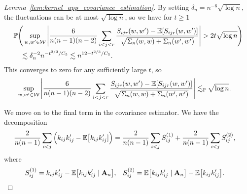 \begin{proof}[Lemma~\ref{lem:kernel_app_covariance_estimation}]
  By setting
  $\delta_n = n^{-6} \sqrt{\log n}$,
  the fluctuations can be at most $\sqrt{\log n}$,
  so we have for $t \geq 1$
  \begin{align*}
    &\mathbb{P}\Bigg(
      \sup_{w, w' \in \mathcal{W}}
      \Bigg|
      \frac{6}{n(n-1)(n-2)}
      \sum_{i<j<r}
      \frac{S_{i j r}(w,w') - \mathbb{E}[S_{i j r}(w,w')]}
      {\sqrt{\Sigma_n(w,w) + \Sigma_n(w',w')}}
      \Bigg|
      > 2t \sqrt{\log n}
    \Bigg) \\
    &\quad\lesssim
    \delta_n^{-2}
    n^{-t^{2/3} / C_5}
    \lesssim
    n^{12-t^{2/3} / C_5}.
  \end{align*}
  This converges to zero for any sufficiently large $t$, so
  \begin{align*}
    \sup_{w, w' \in \mathcal{W}}
    \Bigg|
    \frac{6}{n(n-1)(n-2)}
    \sum_{i<j<r}
    \frac{S_{i j r}(w,w') - \mathbb{E}[S_{i j r}(w,w')]}
    {\sqrt{\Sigma_n(w,w) + \Sigma_n(w',w')}}
    \Bigg|
    &\lesssim_{\mathbb{P}}
    \sqrt{\log n}.
  \end{align*}


  We move on to the final term in
  the covariance estimator.
  We have the decomposition
  \begin{align*}
    \frac{2}{n(n-1)}
    \sum_{i<j}
    \Big(
      k_{i j} k_{i j}'
      - \mathbb{E}\big[k_{i j} k_{i j}']
    \Big)
    &=
    \frac{2}{n(n-1)}
    \sum_{i<j}
    S_{i j}^{(1)}
    +
    \frac{2}{n(n-1)}
    \sum_{i<j}
    S_{i j}^{(2)},
  \end{align*}
  where
  \begin{align*}
    S_{i j}^{(1)}
    &=
    k_{i j} k_{i j}'
    - \mathbb{E}\big[ k_{i j} k_{i j}' \mid \mathbf{A}_n \big],
    &S_{i j}^{(2)}
    &=
    \mathbb{E}\big[ k_{i j} k_{i j}' \mid \mathbf{A}_n \big]
    - \mathbb{E}\big[ k_{i j} k_{i j}' \big].
  \end{align*}



\end{proof}
